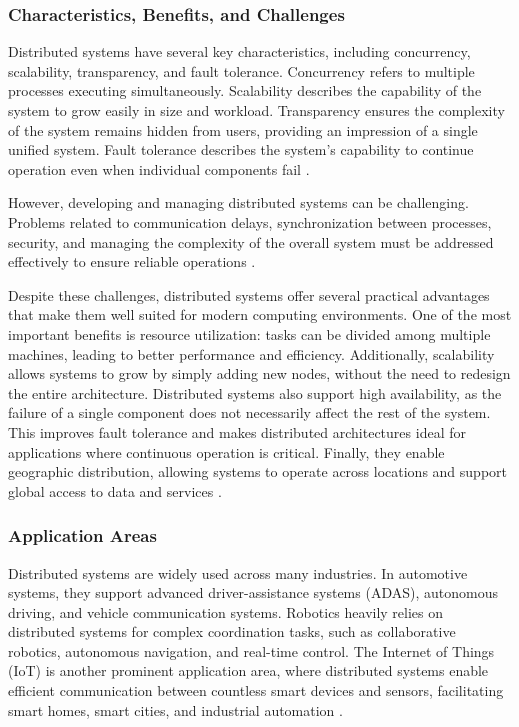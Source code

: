 \subsubsection{Characteristics, Benefits, and Challenges}

Distributed systems have several key characteristics, including concurrency, scalability, transparency, and fault tolerance. Concurrency refers to multiple processes executing simultaneously. Scalability describes the capability of the system to grow easily in size and workload. Transparency ensures the complexity of the system remains hidden from users, providing an impression of a single unified system. Fault tolerance describes the system's capability to continue operation even when individual components fail \cite{tanenbaum2017}.

\vspace{1em}
However, developing and managing distributed systems can be challenging. Problems related to communication delays, synchronization between processes, security, and managing the complexity of the overall system must be addressed effectively to ensure reliable operations \cite{coulouris2012}.

\vspace{1em}
Despite these challenges, distributed systems offer several practical advantages that make them well suited for modern computing environments. One of the most important benefits is resource utilization: tasks can be divided among multiple machines, leading to better performance and efficiency. Additionally, scalability allows systems to grow by simply adding new nodes, without the need to redesign the entire architecture. Distributed systems also support high availability, as the failure of a single component does not necessarily affect the rest of the system. This improves fault tolerance and makes distributed architectures ideal for applications where continuous operation is critical. Finally, they enable geographic distribution, allowing systems to operate across locations and support global access to data and services \cite{tanenbaum2017,coulouris2012}.

\subsubsection{Application Areas}

Distributed systems are widely used across many industries. In automotive systems, they support advanced driver-assistance systems (ADAS), autonomous driving, and vehicle communication systems. Robotics heavily relies on distributed systems for complex coordination tasks, such as collaborative robotics, autonomous navigation, and real-time control. The Internet of Things (IoT) is another prominent application area, where distributed systems enable efficient communication between countless smart devices and sensors, facilitating smart homes, smart cities, and industrial automation \cite{tanenbaum2017,coulouris2012}.



